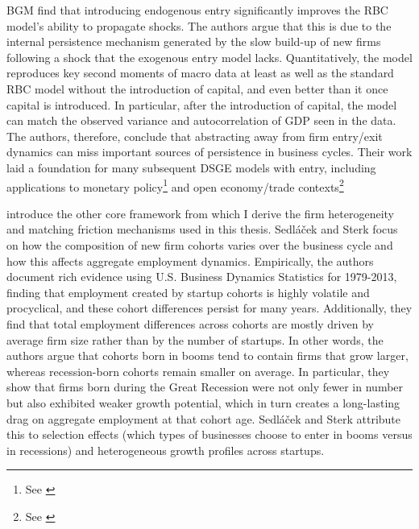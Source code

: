 \documentclass[a4paper,12pt]{article} %
\numberwithin{equation}{section} %
\numberwithin{figure}{section}
\numberwithin{table}{section}
\begin{document}
BGM find that introducing endogenous entry significantly improves the RBC model's ability to propagate shocks. The authors argue that this is due to the internal 
persistence mechanism generated by the slow build-up of new firms following a shock that the exogenous entry model lacks. Quantitatively, the model reproduces key 
second moments of macro data at least as well as the standard RBC model without the introduction of capital, and even better than it once capital is introduced. 
In particular, after the introduction of capital, the model can match the observed variance and autocorrelation of GDP seen in the data. The authors, therefore, 
conclude that abstracting away from firm entry/exit dynamics can miss important sources of persistence in business cycles. Their work laid a foundation for many 
subsequent DSGE models with entry, including applications to monetary policy\footnote{See \textcite{bilbiie2007monetary,bergin2008extensive,etro2015new}} and 
open economy/trade contexts\footnote{See \textcite{epifani2011trade,bergin2015international}}

\textcite{sedlavcek2017growth} introduce the other core framework from which I derive the firm heterogeneity and matching friction mechanisms used in this thesis. 
Sedláček and Sterk focus on how the composition of new firm cohorts varies over the business cycle and how this affects aggregate employment dynamics. 
Empirically, the authors document rich evidence using U.S. Business Dynamics Statistics for 1979-2013, finding that employment created by startup cohorts is highly
volatile and procyclical, and these cohort differences persist for many years. Additionally, they find that total employment differences across cohorts are mostly
driven by average firm size rather than by the number of startups. In other words, the authors argue that cohorts born in booms tend to contain firms that grow
larger, whereas recession-born cohorts remain smaller on average. In particular, they show that firms born during the Great Recession were not only fewer in 
number but also exhibited weaker growth potential, which in turn creates a long-lasting drag on aggregate employment at that cohort age. Sedláček and Sterk 
attribute this to selection effects (which types of businesses choose to enter in booms versus in recessions) and heterogeneous growth profiles across startups.
\end{document}
